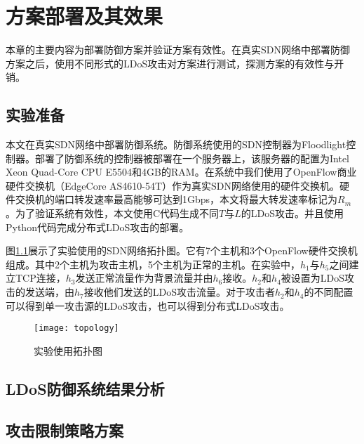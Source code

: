 \chapter{方案部署及其效果}
\label{cha:experiment}
本章的主要内容为部署防御方案并验证方案有效性。在真实SDN网络中部署防御方案之后，使用不同形式的LDoS攻击对方案进行测试，探测方案的有效性与开销。

\section{实验准备}
\label{chap5:setup}
本文在真实SDN网络中部署防御系统。防御系统使用的SDN控制器为Floodlight控制器。部署了防御系统的控制器被部署在一个服务器上，该服务器的配置为Intel Xeon Quad-Core CPU E5504和4GB的RAM。在系统中我们使用了OpenFlow商业硬件交换机（EdgeCore AS4610-54T）作为真实SDN网络使用的硬件交换机。硬件交换机的端口转发速率最高能够可达到1Gbps，本文将最大转发速率标记为$R_m$。为了验证系统有效性，本文使用C代码生成不同$T$与$L$的LDoS攻击。并且使用Python代码完成分布式LDoS攻击的部署。

图\ref{fig:topology}展示了实验使用的SDN网络拓扑图。它有7个主机和3个OpenFlow硬件交换机组成。其中2个主机为攻击主机，5个主机为正常的主机。在实验中，$h_1$与$h_5$之间建立TCP连接，$h_3$发送正常流量作为背景流量并由$h_6$接收。$h_2$和$h_4$被设置为LDoS攻击的发送端，由$h_7$接收他们发送的LDoS攻击流量。对于攻击者$h_2$和$h_4$的不同配置可以得到单一攻击源的LDoS攻击，也可以得到分布式LDoS攻击。


\begin{figure}
    \centering
    \texttt{[image: topology]}
    \caption{实验使用拓扑图}
    \label{fig:topology}
\end{figure}

\section{LDoS防御系统结果分析}
\label{chap5:resultanalysis}

\subsection{}

\section{攻击限制策略方案}